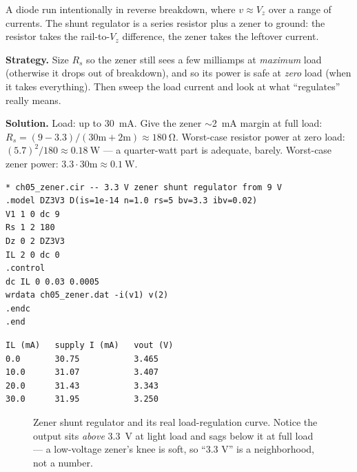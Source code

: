 \begin{definition}
A diode run intentionally in reverse breakdown, where $v\approx V_z$
over a range of currents. The shunt regulator is a series resistor plus
a zener to ground: the resistor takes the rail-to-$V_z$ difference, the
zener takes the leftover current.
\end{definition}

\begin{example}\label{ex:zener}
\textbf{Strategy.} Size $R_s$ so the zener still sees a few milliamps at
\emph{maximum} load (otherwise it drops out of breakdown), and so its
power is safe at \emph{zero} load (when it takes everything). Then
sweep the load current and look at what ``regulates'' really means.

\textbf{Solution.} Load: up to \qty{30}{\milli\ampere}. Give the zener
$\sim$\qty{2}{\milli\ampere} margin at full load:
$R_s=(9-3.3)/(30\text{m}+2\text{m})\approx\qty{180}{\ohm}$. Worst-case
resistor power at zero load: $(5.7)^2/180\approx\qty{0.18}{\watt}$ ---
a quarter-watt part is adequate, barely. Worst-case zener power:
$3.3\cdot30\text{m}\approx\qty{0.1}{\watt}$.

\begin{lstlisting}[caption={\ttfamily code/ch05\_zener.cir --- shunt
regulator; the \texttt{.dc} sweep drives a current source as the load
and records $v_{\mathrm{out}}$.},label=lst:zener]
* ch05_zener.cir -- 3.3 V zener shunt regulator from 9 V
.model DZ3V3 D(is=1e-14 n=1.0 rs=5 bv=3.3 ibv=0.02)
V1 1 0 dc 9
Rs 1 2 180
Dz 0 2 DZ3V3
IL 2 0 dc 0
.control
dc IL 0 0.03 0.0005
wrdata ch05_zener.dat -i(v1) v(2)
.endc
.end
\end{lstlisting}

\begin{lstlisting}[caption={Selected rows of the \texttt{.dc} sweep
(every 10th of 61): load current, total supply current, output voltage.
Notice $v_{\mathrm{out}}$ slides \qty{0.22}{\volt} end to end --- this is
regulation, not magic.}]
IL (mA)   supply I (mA)   vout (V)
0.0       30.75           3.465
10.0      31.07           3.407
20.0      31.43           3.343
30.0      31.95           3.250
\end{lstlisting}
\end{example}

\begin{figure}[htbp]
\centering

\caption{Zener shunt regulator and its real load-regulation curve.
Notice the output sits \emph{above} \qty{3.3}{\volt} at light load and
sags below it at full load --- a low-voltage zener's knee is soft, so
``3.3 V'' is a neighborhood, not a number.}
\label{fig:zener}
\end{figure}

